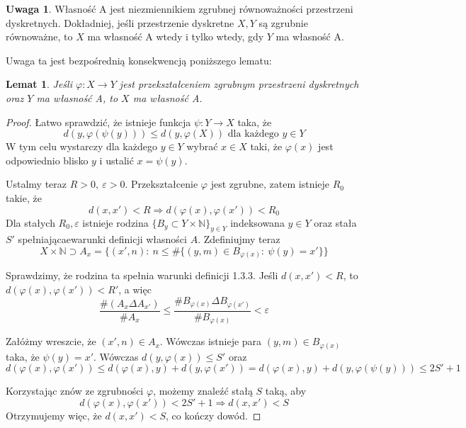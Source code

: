 \documentclass[licencjacka]{pracamgr}
\theoremstyle{definition}
\theoremstyle{definition}
\newtheorem{remark}{Uwaga}[section]
\theoremstyle{definition}
\theoremstyle{definition}
\theoremstyle{definition}
\theoremstyle{plain}
\newtheorem{lemma}{Lemat}[section]
\theoremstyle{plain}
\begin{document}
\begin{remark}
	Własność A jest niezmiennikiem zgrubnej równoważności przestrzeni dyskretnych. 
	Dokładniej, jeśli przestrzenie dyskretne $ X,Y $ są zgrubnie równoważne, to 
	$ X $ ma własność A wtedy i tylko wtedy, gdy $ Y $ ma własność A.
\end{remark}

Uwaga ta jest bezpośrednią konsekwencją poniższego lematu:

\begin{lemma}
	Jeśli $ \varphi: X \rightarrow Y $ jest przekształceniem zgrubnym przestrzeni dyskretnych 
	oraz $ Y $ ma własność A, to $ X $ ma własność A.
\end{lemma}
\begin{proof}
	Łatwo sprawdzić, że istnieje funkcja $\psi: Y \rightarrow X $ taka, że
	$$ d(y, \varphi(\psi(y)))  \leq d(y,  \varphi(X)) \text{ dla każdego } y \in Y$$
	W tym celu wystarczy dla każdego $ y \in Y $ wybrać $ x \in X $ taki, że 
	$ \varphi(x) $ jest odpowiednio blisko $ y $ i ustalić $ x = \psi(y) $.

	Ustalmy teraz $ R > 0,~  \varepsilon > 0 $. Przekształcenie $\varphi$ jest zgrubne, zatem 
	istnieje $ R_0 $ takie, że $$ d(x,x') < R \Rightarrow d(\varphi(x), \varphi(x')) < R_0 $$ 
	Dla stałych $ R_0, \varepsilon $ istnieje rodzina 
	$ \{B_y \subset Y \times \mathbb{N}\}_{y \in Y} $ 
	indeksowana $ y \in Y $ oraz stała $S'$ spełniającaewarunki definicji własności $ A $.
 	 Zdefiniujmy 
	teraz 
	$$ X \times \mathbb{N} \supset A_x = \{(x', n): ~ n \leq \# \{ (y,m) \in B_{\varphi(x)} : ~
	\psi(y) = x' \}\} $$

	Sprawdzimy, że rodzina ta spełnia warunki definicji 1.3.3. Jeśli 
	$ d(x,x') < R $, to $ d(\varphi(x), \varphi(x')) < R' $, a więc 
	$$ \frac{\# (A_x \Delta A_{x'})}{\# A_x} \leq \frac{\# B_{\varphi(x)} \Delta 
	B_{\varphi(x')}}{\# B_{\varphi(x)}} < \varepsilon $$

	Załóżmy wreszcie, że $ (x', n) \in A_x $. Wówczas istnieje para $ (y,m) \in 
	B_{\varphi(x)} $ taka, że $ \psi(y) = x' $. Wówczas $d(y,\varphi(x)) \leq S'$ oraz 
	$$ d(\varphi(x), \varphi(x')) \leq d(\varphi(x),y) + d(y,\varphi(x')) = d(\varphi(x),y) + 
	d(y, \varphi(\psi(y))) \leq 2S' + 1 $$

	Korzystając znów ze zgrubności $\varphi$, możemy znaleźć stałą $ S $ taką, aby 
	$$ d(\varphi(x), \varphi(x')) < 2S' +1 \Rightarrow d(x,x') < S $$
	Otrzymujemy więc, że $ d(x,x') < S $, co kończy dowód.
\end{proof}
\end{document}
